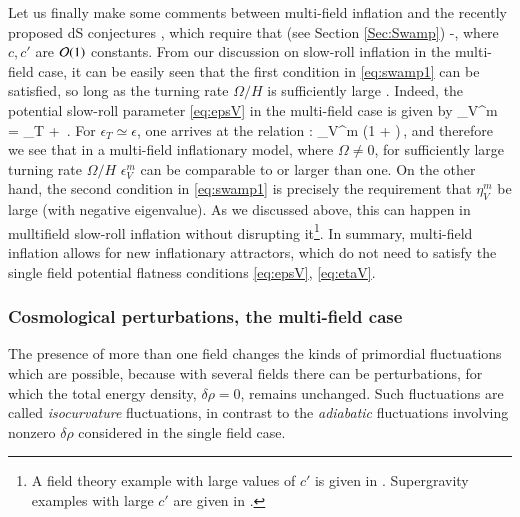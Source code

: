Let us finally make some comments  between multi-field  inflation and the recently proposed dS conjectures \cite{Obied:2018sgi,Garg:2018reu,Ooguri:2018wrx}, which require that (see Section \ref{Sec:Swamp})
\bea\label{eq:swamp1}
  \geq {}    \qquad %
   \leq -,
\eea
where $c, c'$ are  ${\cal O}(1)$ constants.
From our discussion on  slow-roll inflation in the multi-field case, it can be easily seen that  the first condition in \eqref{eq:swamp1} can be satisfied, so long as the  turning rate $\Omega/H$  is sufficiently large \cite{Achucarro:2018vey}.
Indeed, the potential slow-roll parameter \eqref{eq:epsV} in  the multi-field case is given by
\be\label{epsimulti}
\epsilon_V^m \equiv {}  = \epsilon_T + \epsilon \,.
\ee
For $\epsilon_T\simeq \epsilon$,  one arrives at the relation  \cite{Achucarro:2018vey,Hetz:2016ics}:
\be\label{epsV2}
\epsilon_V^m \simeq \epsilon\left(1  + \right)\,,
\ee
and therefore we see that in a multi-field inflationary model, where $\Omega\ne 0$, for sufficiently large turning rate  $\Omega/H$  $\epsilon_V^m$ can be comparable to or larger than one.
On the other hand, the second condition in \eqref{eq:swamp1} is precisely the requirement that $\eta_V^m$  be large (with negative eigenvalue). As we discussed above, this can happen in mulltifield slow-roll inflation without disrupting it\footnote{A field theory example with large values of $c'$ is given in \cite{Christodoulidis:2018qdw}. Supergravity examples with large $c'$ are given in \cite{Aragam:2021scu}.}.
In summary, multi-field inflation allows for  new inflationary attractors, which do not need to satisfy the single field potential flatness conditions \eqref{eq:epsV}, \eqref{eq:etaV}.



\subsubsection{Cosmological perturbations, the multi-field case}

The presence of more than one field changes the kinds of primordial fluctuations which are possible, because with several fields there can be perturbations,  for which the total energy density, $\delta\rho=0$, remains unchanged. Such fluctuations are called  {\em isocurvature} fluctuations, in contrast to the {\em adiabatic} fluctuations involving nonzero $\delta\rho$ considered in the single field case.

